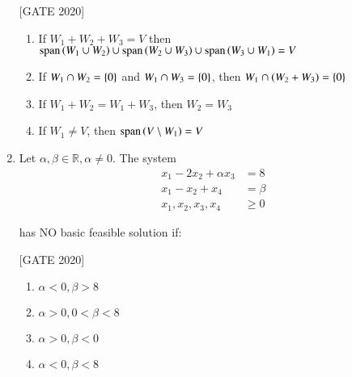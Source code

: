 \documentclass[journal,12pt,onecolumn]{IEEEtran}
\theoremstyle{remark}
\begin{document}
\begin{enumerate}
    \hfill{[GATE 2020]}\begin{enumerate}
        \item If $ W_1 + W_2 + W_3 = V $ then $ \text{span}\left(W_1 \cup W_2\right) \cup \text{span}\left(W_2 \cup W_3\right) \cup \text{span}\left(W_3 \cup W_1\right) = V $
        \item If $ W_1 \cap W_2 = \left\{0\right\} $ and $ W_1 \cap W_3 = \left\{0\right\} $, then $ W_1 \cap \left(W_2 + W_3\right) = \left\{0\right\} $
        \item If $ W_1 + W_2 = W_1 + W_3 $, then $ W_2 = W_3 $
        \item If $ W_1 \neq V $, then $ \text{span}\left(V \setminus W_1\right) = V $
    \end{enumerate}
    

    \item    Let $ \alpha, \beta \in \mathbb{R}, \alpha \neq 0 $. The system 
    \begin{align*}
    x_1 - 2x_2 + \alpha x_3 &= 8 \\
    x_1 - x_2 + x_4 &= \beta \\
    x_1, x_2, x_3, x_4 &\geq 0
\end{align*}

    has NO basic feasible solution if:
    
    \hfill{[GATE 2020]}\begin{multicols}{2}\begin{enumerate}
        \item $ \alpha < 0, \beta > 8 $
        \item $ \alpha > 0, 0 < \beta < 8 $
        \item $ \alpha > 0, \beta < 0 $
        \item $ \alpha < 0, \beta < 8 $
    \end{enumerate}
    \end{multicols}
\end{enumerate}
\end{document}

